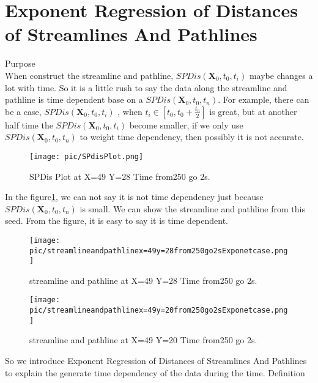 \documentclass[
     11pt,         %
     a4paper,      %
     oneside,
     ]{article}
\newcommand{\vect}[1]{\boldsymbol{#1}}
\begin{document}
\section{Exponent Regression of Distances of Streamlines And Pathlines}

   Purpose\\
	When construct the streamline and pathline, $SPDis(\vect{X}_{0},t_{0},t_{i})$ maybe changes a lot with time. So it is a little rush to say the data along the streamline and pathline is time dependent base on a  $SPDis(\vect{X}_{0},t_{0},t_{n})$. For example, there can be a case, $SPDis(\vect{X}_{0},t_{0},t_{i})$ , when $t_{i}\in[t_{0},t_{0}+\frac{t_{n}}{2}]$ is great, but at another half time the $SPDis(\vect{X}_{0},t_{0},t_{i})$  become smaller, if we only use $SPDis(\vect{X}_{0},t_{0},t_{n})$ to weight time dependency, then possibly it is not accurate.
	\begin{figure}[H]
	 		\centering
	 		\texttt{[image: pic/SPdisPlot.png]}
	 		\caption{{\tiny SPDis Plot at X=49 Y=28 Time from250 go 2s.}}
	 		\label{fig:SPdisPlot}
	\end{figure}
	In the figure\ref{fig:SPdisPlot}, we can not say it is not time dependency just because  $SPDis(\vect{X}_{0},t_{0},t_{n})$ is small. We can show the streamline and pathline from this seed. From the figure, it is easy to say it is time dependent.
		\begin{figure}[H]
			\centering
			\begin{minipage}{0.45\textwidth}
							\centering
							\texttt{[image: pic/streamlineandpathlinex=49y=28from250go2sExponetcase.png]}
							\caption{{\tiny streamline and pathline at X=49 Y=28 Time from250 go 2s.}}
							\label{fig:streamlineandpathlinex=49y=28from250go2sExponetcase}
			\end{minipage}
						\begin{minipage}{0.45\textwidth}
							\centering
							\texttt{[image: pic/streamlineandpathlinex=49y=20from250go2sExponetcase.png]}
							\caption{{\tiny streamline and pathline at X=49 Y=20 Time from250 go 2s.}}
							\label{fig:streamlineandpathlinex=49y=20from250go2sExponetcase}
						\end{minipage}

		\end{figure}
	So we introduce Exponent Regression of Distances of Streamlines And Pathlines to explain the generate time dependency of the data during the time.
	 Definition\\
\end{document}
